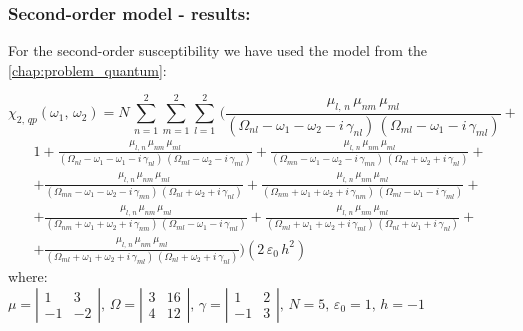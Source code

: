 \documentclass[12pt,twoside,a4paper]{article}
\numberwithin{equation}{subsection}
\numberwithin{figure}{subsection}
\begin{document}
\subsubsection*{Second-order model - results:}

For the second-order susceptibility we have used the model from the \ref{chap:problem_quantum}:

\begin{equation} \label{nclin_chipp2}
  \chi_{2, \,qp}({\omega_{1}}, \,{\omega_{2}})=N\,\sum_{n=1}^{2}\sum_{m=1}^{2}\sum_{l=1}^{2}\,
    (\frac {{\mu_{l,\,n}}\,{\mu_{nm}}\,{\mu_{ml}}}
      {({\Omega_{nl}} - \omega_1 - \omega_2 - i\,{\gamma_{nl}})\,({\Omega_{ml}} - \omega_1 - i\,{\gamma_{ml}})} +
\end{equation}
\begin{alignat*}{1}
  + \frac   {{\mu_{l, \,n}}\,{\mu_{nm}}\,{\mu_{ml}}}
      {({\Omega_{nl}} - \omega_1 - \omega_1 - i\,{\gamma_{nl}})\,({\Omega_{ml}} - \omega_2 - i\,{\gamma_{ml}})}
      \nonumber 
  + \frac   {{\mu_{l, \,n}}\,{\mu_{nm}}\,{\mu_{ml}}}
      {({\Omega_{mn}} - \omega_1 - \omega_2 - i\,{\gamma_{mn}})\,({\Omega_{nl}} + \omega_2 + i\,{\gamma_{nl}})}
      \nonumber 
+\\ + \frac{{\mu_{l, \,n }}\,{\mu_{nm}}\,{\mu_{ml}}} 
      {({\Omega_{mn}} - \omega_1 - \omega_2 - i\,{\gamma_{mn}})\,({\Omega_{nl}} + \omega_2 + i\,{\gamma_{nl}})} 
  + \frac   {{\mu_{l, \,n}}\,{\mu_{nm}}\,{\mu_{ml}}}
      {({\Omega_{nm}} + \omega_1 + \omega_2 + i\,{\gamma_{nm}})\,({\Omega_{ml}} - \omega_1 - i\,{\gamma_{ml}})}
      \nonumber
+\\ + \frac {{\mu_{l, \,n}}\,{\mu_{ nm}}\,{\mu_{ml}}}
      {({\Omega_{nm}} + \omega_1 + \omega_2 + i\,{\gamma_{nm}})\,({\Omega_{ml}} - \omega_1 - i\,{\gamma_{ml}})} 
  + \frac {{\mu_{l, \,n}}\,{\mu_{nm}}\,{\mu_{ml}}}
      {({\Omega_{ml}} + \omega_1 + \omega_2 + i\,{\gamma_{ml}})\,({\Omega_{nl}} + \omega_1 + i\,{\gamma_{nl}})}
      \nonumber 
+\\ + \frac {{\mu_{l, \,n}}\,{\mu_{nm}}\,{\mu_{ml}}}
      {({\Omega_{ml}} + \omega_1 + \omega_2 + i\,{\gamma_{ml}})\,({\Omega_{nl}} + \omega_2 + i\,{\gamma_{nl}})})  
      (2\,{\varepsilon_{0}}\,h^{2})
\end{alignat*}
where: \\
$\mu = \left| \begin{array}{cc} 
    1 & 3 \\ -1 & -2 
  \end{array} \right|,\, 
  \Omega = \left| \begin{array}{cc} 
    3 & 16 \\ 4 & 12 
  \end{array} \right|,\,
  \gamma = \left| \begin{array}{cc} 
  1 & 2 \\ -1 & 3
  \end{array} \right|,\, N=5,\, {\varepsilon_{0}}=1,\,h= - 1$
\end{document}
